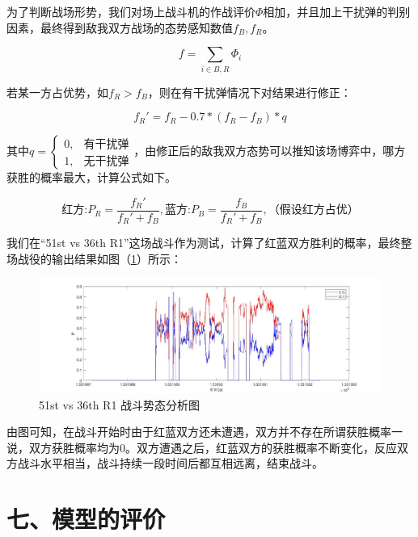 \documentclass{my_paper}
\begin{document}
为了判断战场形势，我们对场上战斗机的作战评价$\Phi$相加，并且加上干扰弹的判别因素，最终得到敌我双方战场的态势感知数值$f_B,f_R$。

\begin{equation}
f = \sum_{i \in B,R} \Phi_i
\end{equation}

若某一方占优势，如$f_R>f_B$，则在有干扰弹情况下对结果进行修正：

\begin{equation}
    f_R' = f_R - 0.7*(f_R-f_B)*q
\end{equation}

其中$q=\begin{cases}0,&\text{有干扰弹}\\1,&\text{无干扰弹}\end{cases}$，由修正后的敌我双方态势可以推知该场博弈中，哪方获胜的概率最大，计算公式如下。

\begin{equation}
    \text{红方:}P_R = \frac{f_R'}{f_R'+f_B} ,\text{蓝方:} P_B = \frac{f_B}{f_R'+f_B},\text{（假设红方占优）}
\end{equation}

我们在“51st vs 36th R1”这场战斗作为测试，计算了红蓝双方胜利的概率，最终整场战役的输出结果如图（\ref{p}）所示：

\begin {figure}[h]
\centering %
\includegraphics[width=\textwidth]{p.jpg}
\caption{51st vs 36th R1 战斗势态分析图} %
\label{p}
\end {figure}

由图可知，在战斗开始时由于红蓝双方还未遭遇，双方并不存在所谓获胜概率一说，双方获胜概率均为0。双方遭遇之后，红蓝双方的获胜概率不断变化，反应双方战斗水平相当，战斗持续一段时间后都互相远离，结束战斗。


\section{七、模型的评价}
\end{document}
